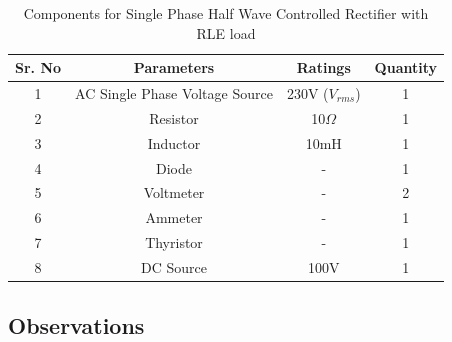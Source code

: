 \begin{table}[h]
    \renewcommand{\arraystretch}{1.3}
    \label{table_components_required_circuit_7}
    \centering
    \begin{tabular}{|c|c|c|c|}
        \hline
        Sr. No & Parameters                     & Ratings            & Quantity \\
        \hline
        \hline
        1      & AC Single Phase Voltage Source & 230V ($ V_{rms} $) & 1        \\
        \hline
        2      & Resistor                       & 10$ \Omega $       & 1        \\
        \hline
        3      & Inductor                       & 10mH               & 1        \\
        \hline
        4      & Diode                          & -                  & 1        \\
        \hline
        5      & Voltmeter                      & -                  & 2        \\
        \hline
        6      & Ammeter                        & -                  & 1        \\
        \hline
        7      & Thyristor                      & -                  & 1        \\
        \hline
        8      & DC Source                      & 100V               & 1        \\
        \hline
    \end{tabular}
    \caption{Components for Single Phase Half Wave Controlled Rectifier with RLE load}

\end{table}

\pagebreak

\subsection{Observations}

